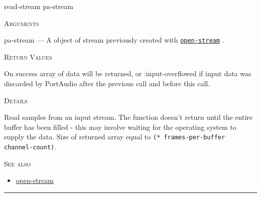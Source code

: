 \documentclass[a4paper]{report}
\begin{document}
    \label{portaudio__fun__read-stream}
    \begin{defun}[Function]
    read-stream pa-stream


    
    \bigskip
    \textsc{Arguments}

pa-stream
	--- A object of stream previously created with \hyperref[portaudio__fun__open-stream]{\texttt{open-stream}}
  .




    
    \bigskip
    \textsc{Return Values}


On success array of data will be returned, or :input-overflowed if input data was discarded by PortAudio after the previous call and before this call. 


	
    \bigskip
    \textsc{Details}

Read samples from an input stream. The function doesn't return until the entire buffer has been filled - this may involve waiting for the operating system to supply the data. Size of returned array equal to \texttt{(* frames-per-buffer channel-count)}.






      
    \bigskip
    \textsc{See also}


	
    \begin{itemize}
    
	  
    \item
    \hyperref[portaudio__fun__open-stream]{open-stream}
    
	
    \end{itemize}
  
      


    
    \end{defun}
  
  

    \rule{\linewidth}{0.1mm}
    
\end{document}

